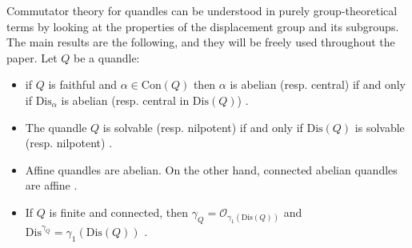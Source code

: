 \documentclass[a4paper, english, 9pt]{amsart}
\theoremstyle{plain}
\newtheorem{corollary}[theorem]{Corollary}
\newtheorem{proposition}[theorem]{Proposition}
\theoremstyle{definition}
\def\dis{\mathrm{Dis}}
\def\con{\mathrm{Con}}
\def\comment#1{{\color{red} #1}}
\begin{document}
Commutator theory for quandles can be understood in purely group-theoretical terms by looking at the properties of the displacement group and its subgroups. The main results are the following, and they will be freely used throughout the paper. Let $Q$ be a quandle:
\begin{itemize}
    \item 
    if $Q$ is faithful and $\alpha\in \con(Q)$ then $\alpha$ is abelian (resp. central) if and only if $\dis_\alpha$ is abelian (resp. central in $\dis(Q)$) \cite[Corollary 5.4]{CP}.

\item The quandle $Q$ is solvable (resp. nilpotent) if and only if $\dis(Q)$ is solvable (resp. nilpotent) \cite[Theorem 1.2]{CP}.



\item Affine quandles are abelian. On the other hand, connected abelian quandles are affine \cite[Corollary 3.4]{Medial}.



\item If $Q$ is finite and connected, then $\gamma_Q=\mathcal{O}_{\gamma_1(\dis(Q))}$ and $\dis^{\gamma_Q}=\gamma_1(\dis(Q))$ \cite[Proposition 1.7]{GB}.

%
 



 

\end{itemize}
\end{document}
